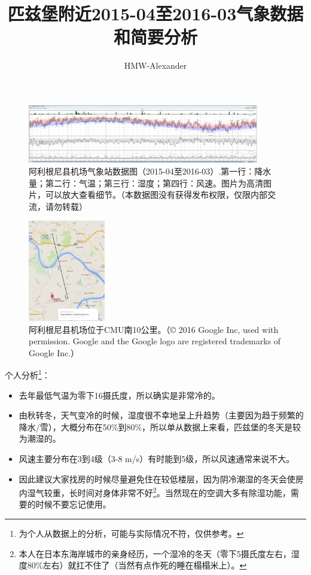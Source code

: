 \documentclass[a4paper,11pt]{article}
\title{匹兹堡附近2015-04至2016-03气象数据和简要分析}
\author{HMW-Alexander}
\begin{document}
\maketitle

\begin{figure}[!htb]
\centering
\includegraphics[width=0.9\textwidth]{data}
\caption{阿利根尼县机场气象站数据图（2015-04至2016-03）.第一行：降水量；第二行：气温；第三行：湿度；第四行：风速。图片为高清图片，可以放大查看细节。（本数据图没有获得发布权限，仅限内部交流，请勿转载）}
\end{figure}

\begin{figure}[!htb]
\centering
\includegraphics[width=0.3\textwidth]{loc}
\caption{阿利根尼县机场位于CMU南10公里。（© 2016 Google Inc, used with permission. Google and the Google logo are registered trademarks of Google Inc.）}
\end{figure}

个人分析\footnote{为个人从数据上的分析，可能与实际情况不符，仅供参考。}：
\begin{itemize}
	\item 去年最低气温为零下16摄氏度，所以确实是非常冷的。
	\item 由秋转冬，天气变冷的时候，湿度很不幸地呈上升趋势（主要因为趋于频繁的降水/雪），大概分布在50\%到80\%，所以单从数据上来看，匹兹堡的冬天是较为潮湿的。
	\item 风速主要分布在3到4级（3-8 m/s）有时能到5级，所以风速通常来说不大。
	\item 因此建议大家找房的时候尽量避免住在较低楼层，因为阴冷潮湿的冬天会使房内湿气较重，长时间对身体非常不好\footnote{本人在日本东海岸城市的亲身经历，一个湿冷的冬天（零下5摄氏度左右，湿度80\%左右）就扛不住了（当然有点作死的睡在榻榻米上）。}。当然现在的空调大多有除湿功能，需要的时候不要忘记使用。
\end{itemize}
\end{document}
